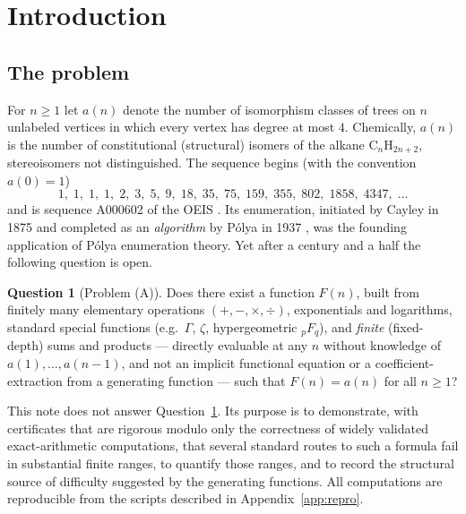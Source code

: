 \documentclass[11pt]{article}
\theoremstyle{definition}
\newtheorem{question}[theorem]{Question}
\newcommand{\seqA}{\textnormal{A000602}}
\begin{document}
\tableofcontents

\section{Introduction}

\subsection{The problem}

For $n\ge 1$ let $a(n)$ denote the number of isomorphism classes of trees on $n$
unlabeled vertices in which every vertex has degree at most $4$. Chemically,
$a(n)$ is the number of constitutional (structural) isomers of the alkane
$\mathrm{C}_n\mathrm{H}_{2n+2}$, stereoisomers not distinguished. The sequence
begins (with the convention $a(0)=1$)
\[
1,\;1,\;1,\;1,\;2,\;3,\;5,\;9,\;18,\;35,\;75,\;159,\;355,\;802,\;1858,\;4347,\;\dots
\]
and is sequence \seqA{} of the OEIS \cite{OEIS}. Its enumeration, initiated by
Cayley in 1875 \cite{Cayley1875} and completed as an \emph{algorithm} by
P\'olya in 1937 \cite{Polya1937}, was the founding application of P\'olya
enumeration theory. Yet after a century and a half the following question is
open.

\begin{question}[Problem (A)]\label{q:A}
Does there exist a function $F(n)$, built from finitely many elementary
operations $(+,-,\times,\div)$, exponentials and logarithms, standard special
functions (e.g.\ $\Gamma$, $\zeta$, hypergeometric ${}_pF_q$), and \emph{finite}
(fixed-depth) sums and products --- directly evaluable at any $n$ without
knowledge of $a(1),\dots,a(n-1)$, and not an implicit functional equation or a
coefficient-extraction from a generating function --- such that $F(n)=a(n)$ for
all $n\ge 1$?
\end{question}

This note does not answer Question~\ref{q:A}. Its purpose is to demonstrate,
with certificates that are rigorous modulo only the correctness of widely
validated exact-arithmetic computations, that several standard routes to such a
formula fail in substantial finite ranges, to quantify those ranges, and to
record the structural source of difficulty suggested by the generating
functions. All computations are
reproducible from the scripts described in Appendix~\ref{app:repro}.
\end{document}

